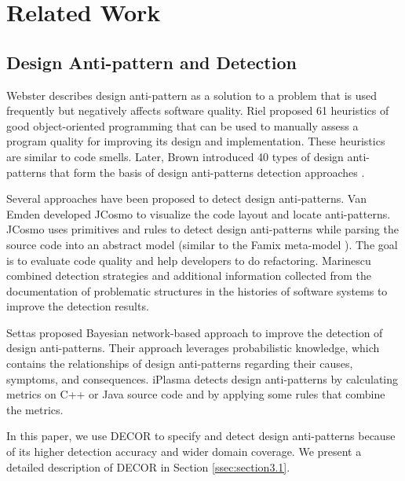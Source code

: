 \section{Related Work}
\label{sec:Related Works}

\subsection{Design Anti-pattern and Detection}

Webster \etal \cite{webster1995pitfalls} describes design anti-pattern as a solution to a problem that is used frequently but negatively affects software quality. Riel \etal \cite{riel1996object} proposed 61 heuristics of good object-oriented programming that can be used to manually assess a program quality for improving its design and implementation. These heuristics are similar to code smells. Later, Brown \etal \cite{brown1998antipatterns} introduced 40 types of design anti-patterns that form the basis of design anti-patterns detection approaches \cite{van2002java,marinescu2006object,moha2010decor,settas2012enhancing}. 

Several approaches have been proposed to detect design anti-patterns. Van Emden \etal \cite{van2002java} developed JCosmo to visualize the code layout and locate anti-patterns. JCosmo uses primitives and rules to detect design anti-patterns while parsing the source code into an abstract model (similar to the Famix meta-model \cite{tichelaar2000meta}). The goal is to evaluate code quality and help developers to do refactoring. Marinescu \etal \cite{ducasse2004using} combined detection strategies and additional information collected from the documentation of problematic structures in the histories of software systems to improve the detection results.

Settas \etal \cite{settas2012enhancing} proposed Bayesian network-based approach to improve the detection of design anti-patterns. Their approach leverages probabilistic knowledge, which contains the relationships of design anti-patterns regarding their causes, symptoms, and consequences. iPlasma \cite{marinescu2006object} detects design anti-patterns by calculating metrics on C++ or Java source code and by applying some rules that combine the metrics. 

In this paper, we use DECOR to specify and detect design anti-patterns because of its higher detection accuracy \cite{moha2010decor} and wider domain coverage. We present a detailed description of DECOR in Section \ref{ssec:section3.1}. 



